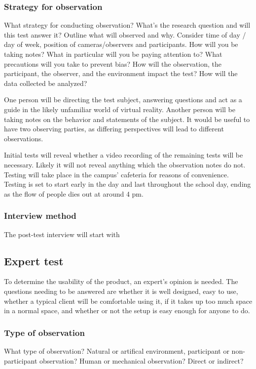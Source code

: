 \subsubsection{Strategy for observation}
What strategy for conducting observation? What's the research question and will this test answer it? Outline what will observed and why. Consider time of day / day of week, position of cameras/observers and participants. How will you be taking notes? What in particular will you be paying attention to? What precautions will you take to prevent bias? How will the observation, the participant, the observer, and the environment impact the test? 
How will the data collected be analyzed?

One person will be directing the test subject, answering questions and act as a guide in the likely unfamiliar world of virtual reality. Another person will be taking notes on the behavior and statements of the subject. It would be useful to have two observing parties, as differing perspectives will lead to different observations. 

Initial tests will reveal whether a video recording of the remaining tests will be necessary. Likely it will not reveal anything which the observation notes do not. Testing will take place in the campus' cafeteria for reasons of convenience. Testing is set to start early in the day and last throughout the school day, ending as the flow of people dies out at around 4 pm.

\subsubsection{Interview method}
The post-test interview will start with 

\subsection{Expert test}
To determine the usability of the product, an expert's opinion is needed. The questions needing to be answered are whether it is well designed, easy to use, whether a typical client will be comfortable using it, if it takes up too much space in a normal space, and whether or not the setup is easy enough for anyone to do.
\subsubsection{Type of observation}
What type of observation? Natural or artifical environment, participant or non-participant observation?
Human or mechanical observation? Direct or indirect?

